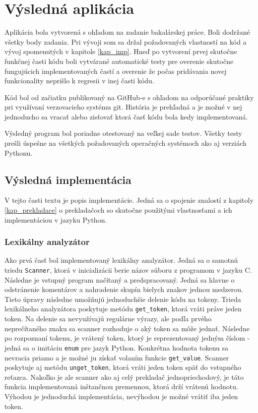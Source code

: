 \chapter{Výsledná aplikácia}
Aplikácia bola vytvorená s ohľadom na zadanie bakalárskej práce. Boli dodržané všetky body zadania. Pri vývoji som sa držal požadovaných vlastností na kód a vývoj spomenutých v kapitole \ref{kap_imp}. Hneď po vytvorení prvej skutočne funkčnej časti kódu boli vytvárané automatické testy pre overenie skutočne fungujúcich implementovaných častí a overenie že počas pridávania novej funkcionality neprišlo k regresii v inej časti kódu. 

Kód bol od začiatku publikovaný na GitHub-e s ohľadom na odporúčané praktiky pri využívaní verzovacieho systému git. História je prehľadná a je možné v nej jednoducho sa vracať alebo zisťovať ktorá časť kódu bola kedy implementovaná.

Výsledný program bol poriadne otestovaný na veľkej sade testov. Všetky testy prešli úspešne na všetkých požadovaných operačných systémoch ako aj verziách Pythonu.

\section{Výsledná implementácia}
V tejto časti textu je popis implementácie. Jedná sa o spojenie znalostí z kapitoly \ref{kap_prekladace} o prekladačoch so skutočne použitými vlastnosťami a ich implementáciou v jazyku Python.
\subsection{Lexikálny analyzátor}
Ako prvá časť bol implementovaný lexikálny analyzátor. Jedná sa o samotnú triedu \texttt{Scanner}, ktorá v inicializácii berie názov súboru z programom v jazyku C. Následne je vstupný program načítaný a predspracovaný. Jedná sa hlavne o odstránenie komentárov a nahradenie skupín bielych znakov jednou medzerou. Tieto úpravy následne umožňujú jednoduchšie delenie kódu na tokeny. Trieda lexikálneho analyzátora poskytuje metódu \texttt{get\_token}, ktorá vráti práve jeden token. Na delenie sa nevyužívajú regulárne výrazy, ale podľa prvého neprečítaného znaku sa scanner rozhoduje o aký token sa môže jednať. Následne po rozpoznaní tokenu, je vrátený token, ktorý je reprezentovaný jedným číslom - jedná sa o imitáciu \texttt{enum} pre jazyk Python. Konkrétna hodnota tokenu sa nevracia priamo a je možné ju získať volaním funkcie \texttt{get\_value}. Scanner poskytuje aj metódu \texttt{unget\_token}, ktorá vráti jeden token späť do vstupného reťazca. Nakoľko je ale scanner ako aj celý prekladač jednopriechodový, je táto funkcia implementovaná inštančnou premennou, ktorá drží vrátenú hodnotu. Výhodou je jednoduchá implementácia, nevýhodou je možné vrátiť iba jeden token.

